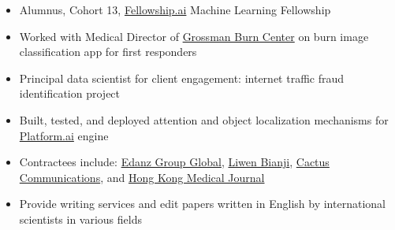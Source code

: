 \documentclass[10pt,a4paper]{altacv}
\begin{document}

\begin{fullwidth}
\makecvheader
\end{fullwidth}




\begin{itemize}
\item Alumnus, Cohort 13, 
\href{https://fellowship.ai/}{Fellowship.ai} Machine Learning Fellowship
\item Worked with Medical Director of 
\href{https://www.grossmanburncenter.com/}{Grossman Burn Center} on burn image classification app for first responders
\item Principal data scientist for client engagement: internet traffic fraud identification project
\item Built, tested, and deployed attention and object localization mechanisms for 
\href{https://platform.ai/}{Platform.ai} engine
\end{itemize}

\divider

\begin{itemize}
\item Contractees include: 
\href{https://www.edanzediting.com/}{Edanz Group Global}, 
\href{https://www.liwenbianji.cn/}{Liwen Bianji}, 
\href{https://www.cactusglobal.com/}{Cactus Communications}, and
\href{https://www.hkmj.org/}{Hong Kong Medical Journal}
\item Provide writing services and edit papers written in English by international scientists in various fields
\end{itemize}
\end{document}
